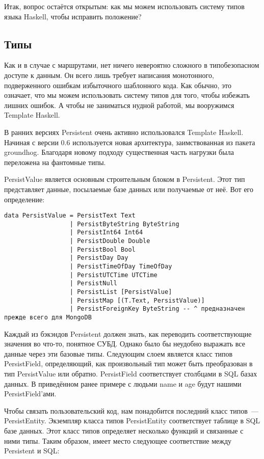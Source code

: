 Итак, вопрос остаётся открытым: как мы можем использовать систему типов языка Haskell, чтобы исправить положение?

\subsection{Типы}

Как и в случае с маршрутами, нет ничего невероятно сложного в типобезопасном доступе к данным. Он всего лишь требует написания монотонного, подверженного ошибкам избыточного шаблонного кода. Как обычно, это означает, что мы можем использовать систему типов для того, чтобы избежать лишних ошибок. А чтобы не заниматься нудной работой, мы вооружимся Template Haskell.

\begin{remark}
В ранних версиях Persistent очень активно использовался Template Haskell. Начиная с версии 0.6 используется новая архитектура, заимствованная из пакета groundhog. Благодаря новому подходу существенная часть нагрузки была переложена на фантомные типы.
\end{remark}

PersistValue является основным строительным блоком в Persistent. Этот тип представляет данные, посылаемые базе данных или получаемые от неё. Вот его определение:

\begin{lstlisting}
data PersistValue = PersistText Text
                  | PersistByteString ByteString
                  | PersistInt64 Int64
                  | PersistDouble Double
                  | PersistBool Bool
                  | PersistDay Day
                  | PersistTimeOfDay TimeOfDay
                  | PersistUTCTime UTCTime
                  | PersistNull
                  | PersistList [PersistValue]
                  | PersistMap [(T.Text, PersistValue)]
                  | PersistForeignKey ByteString -- ^ предназначен прежде всего для MongoDB
\end{lstlisting}

Каждый из бэкэндов Persistent должен знать, как переводить соответствующие значения во что-то, понятное СУБД. Однако было бы неудобно выражать все данные через эти базовые типы. Следующим слоем является класс типов PersistField, определяющий, как произвольный тип может быть преобразован в тип PersistValue или обратно. PersistField соответствует столбцами в SQL базах данных. В приведённом ранее примере с людьми name и age будут нашими PersistField'ами.

Чтобы связать пользовательский код, нам понадобится последний класс типов~--- PersistEntity. Экземпляр класса типов PersistEntity соответствует таблице в SQL базе данных. Этот класс типов определяет несколько функций и связанные с ними типы. Таким образом, имеет место следующее соответствие между Persistent и SQL:

